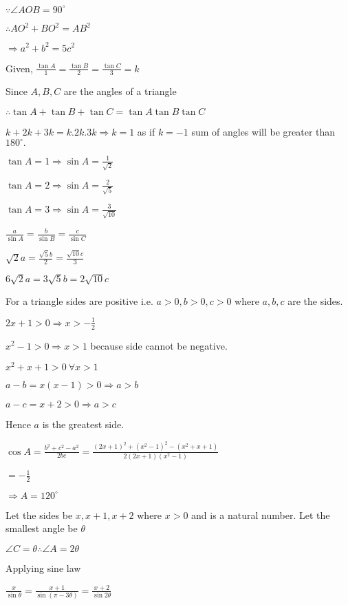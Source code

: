   $\because \angle AOB = 90^\circ$

  $\therefore AO^2 + BO^2 = AB^2$

  $\Rightarrow a^2 + b^2 = 5c^2$

\item Given, $\frac{\tan A}{1} = \frac{\tan B}{2} = \frac{\tan C}{3} = k$

  Since $A, B, C$ are the angles of a triangle

  $\therefore \tan A + \tan B + \tan C = \tan A\tan B\tan C$

  $k + 2k + 3k = k.2k.3k \Rightarrow k = 1$ as if $k = -1$ sum of angles will be greater than $180^\circ.$

  $\tan A = 1 \Rightarrow \sin A = \frac{1}{\sqrt{2}}$

  $\tan A = 2 \Rightarrow \sin A = \frac{2}{\sqrt{5}}$

  $\tan A = 3 \Rightarrow \sin A = \frac{3}{\sqrt{10}}$

  $\frac{a}{\sin A} = \frac{b}{\sin B} = \frac{c}{\sin C}$

  $\sqrt{2}a = \frac{\sqrt{5}b}{2} = \frac{\sqrt{10}c}{3}$

  $6\sqrt{2}a = 3\sqrt{5}b = 2\sqrt{10}c$

\item For a triangle sides are positive i.e. $a > 0, b > 0, c >0$ where $a,b,c$ are the sides.

  $2x + 1 > 0 \Rightarrow x > -\frac{1}{2}$

  $x^2 - 1>0 \Rightarrow x > 1$ because side cannot be negative.

  $x^2 + x + 1 > 0~\forall x>1$

  $a - b = x(x - 1) > 0 \Rightarrow a > b$

  $a - c = x + 2 > 0 \Rightarrow a > c$

  Hence $a$ is the greatest side.

  $\cos A = \frac{b^2 + c^2 - a^2}{2bc} = \frac{(2x + 1)^2 + (x^2 - 1)^2 - (x^2 + x + 1)}{2(2x + 1)(x^2 - 1)}$

  $= -\frac{1}{2}$

  $\Rightarrow A = 120^\circ$

\item Let the sides be $x, x+1, x+2$ where $x > 0$ and is a natural number. Let the smallest angle be $\theta$

  $\angle C = \theta \therefore \angle A = 2\theta$

  Applying sine law

  $\frac{x}{\sin\theta} = \frac{x + 1}{\sin(\pi - 3\theta)} = \frac{x + 2}{\sin2\theta}$


